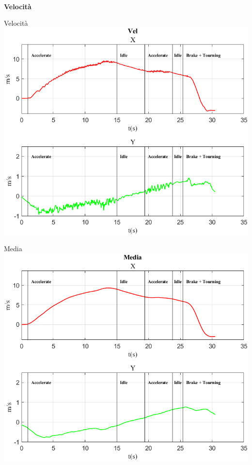 \documentclass[beamer]{standalone}
\begin{document}
	\begin{frame}
		\color{blue}\centering\Huge{\textbf{Velocità}}	
	\end{frame}
	
	\begin{frame}{{Velocità}}
		\centering\includegraphics[height=.8\textheight]{figure/Vel/Vel}
	\end{frame}
	
	\begin{frame}{{Media}}
		\centering\includegraphics[height=.8\textheight]{figure/Vel/Media}
	\end{frame}
	
\end{document}
